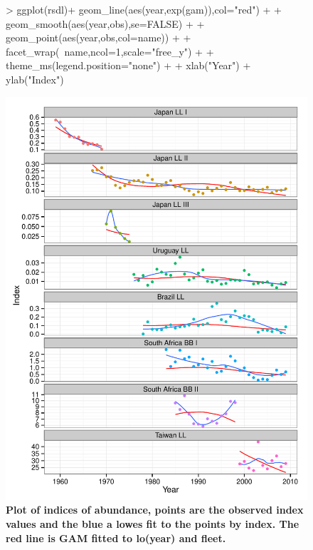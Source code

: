 \documentclass[shortnames,nojss,article]{jss}
\begin{document}
\begin{figure}\begin{center}
\begin{Schunk}
\begin{Sinput}
> ggplot(rsdl)+ geom_line(aes(year,exp(gam)),col="red")  +
+               geom_smooth(aes(year,obs),se=FALSE)      +           
+               geom_point(aes(year,obs,col=name))       +
+               facet_wrap(~name,ncol=1,scale="free_y")  +
+               theme_ms(legend.position="none")         +
+               xlab("Year") + ylab("Index")
\end{Sinput}
\end{Schunk}
\includegraphics{diags-008}
\caption{\bf{Plot of indices of abundance, points are the observed index values and the blue a 
lowes fit to the points by index. The red line is GAM fitted to lo(year) and fleet.}}
\label{cpue:1} 
\end{center}\end{figure}
\end{document}
